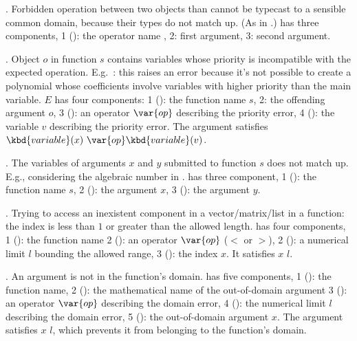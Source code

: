  \item {}. Forbidden operation between two objects than cannot be
 typecast to a sensible common domain, because their types do not match up.
 (As in .)
  has three components, 1 (): the operator name ,
 2: first argument, 3: second argument.

 \item {}. Object $o$ in function $s$ contains
 variables whose priority is incompatible with the expected operation.
 E.g.~: this raises an error because it's not possible to
 create a polynomial whose coefficients involve variables with higher priority
 than the main variable. $E$ has four components: 1 (): the function
 name $s$, 2: the offending argument $o$, 3 (): an operator
 $\var{op}$ describing the priority error, 4 ():
 the variable $v$ describing the priority error. The argument
 satisfies $\kbd{variable}(x)~\var{op} \kbd{variable}(v)$.

 \item {}. The variables of arguments $x$ and $y$ submitted
 to function $s$ does not match up. E.g., considering the algebraic number
  in .
  has three component, 1 (): the function name $s$, 2
 (): the argument $x$, 3 (): the argument $y$.


 \item {}. Trying to access an inexistent component in a
 vector/matrix/list in a function: the index is less than $1$ or greater
 than the allowed length.
  has four components,
 1 (): the function name
 2 (): an operator $\var{op}$ ($<$ or $>$),
 2 (): a numerical limit $l$ bounding the allowed range,
 3 (): the index $x$. It satisfies $x$  $l$.

 \item {}. An argument is not in the function's domain.
  has five components, 1 (): the function name,
 2 (): the mathematical name of the out-of-domain argument
 3 (): an operator $\var{op}$ describing the domain error,
 4 (): the numerical limit $l$ describing the domain error,
 5 (): the out-of-domain argument $x$. The argument satisfies $x$
  $l$, which prevents it from belonging to the function's domain.

